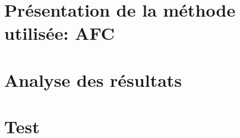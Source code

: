\documentclass[a4paper,notitlepage]{article}
\begin{document}


\newpage
\thispagestyle{empty}

\tableofcontents

\listoffigures

\newpage
\setcounter{page}{1}

\section{Présentation de la méthode utilisée: AFC}



\section{Analyse des résultats}



\section{Test}

\citep{dataset, prince, scipy, matplotlib}


\begin{flushleft}

\end{flushleft}
\end{document}
